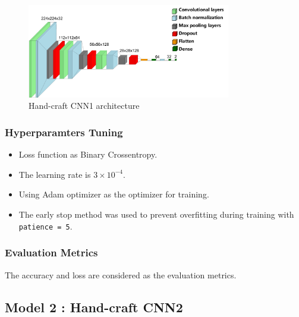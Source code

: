 \documentclass[conference]{IEEEtran}
\begin{document}
\begin{figure}[ht!] %
\centering
\includegraphics[width=3.5in]{CNN1.pdf}
\caption{ Hand-craft CNN1 architecture}
\label{bench}
\end{figure}

\subsubsection{Hyperparamters Tuning}
\begin{itemize}
    \item Loss function as Binary Crossentropy.
    \item The learning rate is $3\times10^{-4}$.
    \item Using Adam optimizer as the optimizer for training. 
    \item The early stop method was used to prevent overfitting during training with \texttt{patience = 5}.
\end{itemize}


\subsubsection{Evaluation Metrics}
The accuracy and loss are considered as the evaluation metrics.


\subsection{Model 2 : Hand-craft CNN2}
\end{document}
